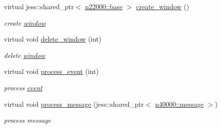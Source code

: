 \begin{DoxyCompactItemize}
virtual jess::shared\_\-ptr$<$ \hyperlink{classnebula_1_1platform_1_1window_1_1base}{n22000::base} $>$ \hyperlink{classnebula_1_1platform_1_1platform_1_1base_a3ea2aaff05ce1406a0fd0e72bdc7074c}{create\_\-window} ()
\begin{DoxyCompactList}\small\item\em create \hyperlink{namespacenebula_1_1platform_1_1window}{window} \item\end{DoxyCompactList}\item 
virtual void \hyperlink{classnebula_1_1platform_1_1platform_1_1base_a587ca0776ffbbd94269afdc577c6085e}{delete\_\-window} (int)
\begin{DoxyCompactList}\small\item\em delete \hyperlink{namespacenebula_1_1platform_1_1window}{window} \item\end{DoxyCompactList}\item 
virtual void \hyperlink{classnebula_1_1platform_1_1platform_1_1base_a1fda0b0def9414c1bd3db49af6c9c825}{process\_\-event} (int)
\begin{DoxyCompactList}\small\item\em process \hyperlink{structnebula_1_1platform_1_1platform_1_1base_1_1event}{event} \item\end{DoxyCompactList}\item 
virtual void \hyperlink{classnebula_1_1platform_1_1platform_1_1base_a0e70c926a1d387e20ba79057065382ba}{process\_\-message} (jess::shared\_\-ptr$<$ \hyperlink{classnebula_1_1asio_1_1message}{n40000::message} $>$)
\begin{DoxyCompactList}\small\item\em process message \item\end{DoxyCompactList}\end{DoxyCompactItemize}
